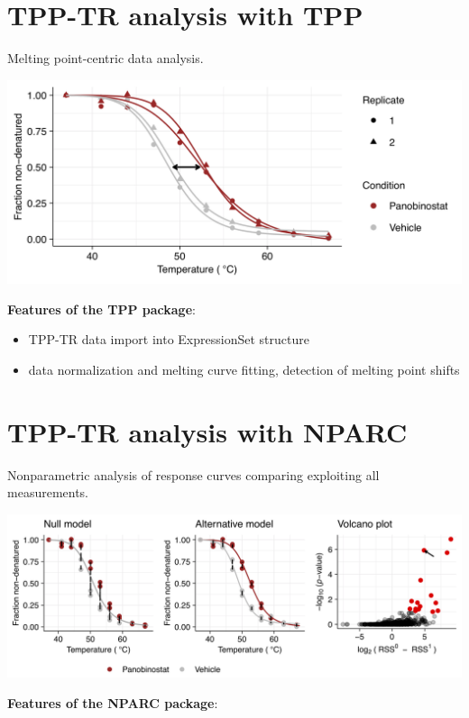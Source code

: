 \documentclass{article}
\newcommand{\hcode}[2][lgray]{{\ttfamily\color{vdgray}\colorbox{#1}{#2}}}
\begin{document}
\begin{multicols}{2}
\noindent
\begin{minipage}[t]{\linewidth}
  \vspace{0.55cm}
  \section*{\huge TPP-TR analysis with \hcode{TPP}}
  Melting point-centric data analysis.
  \begin{center}
  \includegraphics[width=\linewidth]{figs/tpp-tr_example.png}
  \end{center}
  \textbf{Features of the \hcode{TPP} package}:

  \begin{itemize}

  \item TPP-TR data import into ExpressionSet structure
  \item data normalization and melting curve fitting, detection of melting point shifts
  
  \end{itemize}
\end{minipage}

\noindent
\begin{minipage}[t]{\linewidth}
  \vspace{0.55cm}
  \section*{\huge TPP-TR analysis with \hcode{NPARC}}
  Nonparametric analysis of response curves comparing exploiting all measurements. 
  \begin{center}
  \includegraphics[width=\linewidth]{figs/nparc-tr_example.png}
  \end{center}
  \textbf{Features of the \hcode{NPARC} package}:


\end{minipage}
\end{multicols}
\end{document}
